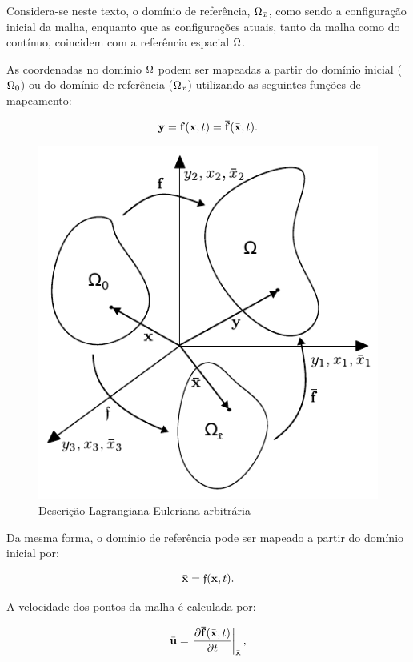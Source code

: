 \documentclass[tese_patricia]{subfiles}%
\begin{document}
Considera-se neste texto, o domínio de referência, $\Omega_{\bar{x}}$, como sendo a configuração inicial da malha, enquanto que as configurações atuais, tanto da malha como do contínuo, coincidem com a referência espacial $\Omega$.

As coordenadas no domínio $\Omega$ podem ser mapeadas a partir do domínio inicial ($\Omega_{0}$) ou do domínio de referência ($\Omega_{\bar{x}}$) utilizando as seguintes funções de mapeamento:  

\begin{align}
	\mathbf{y} = \mathbf{f}(\mathbf{x},t) = \mathbf{\bar{f}}(\bar{\mathbf{x}},t).
\end{align}

\begin{figure}[htb!]
	\centering
	\includegraphics[scale=1.0]{Imagens/Cap2/dominioALE.pdf}	
	\caption{Descrição Lagrangiana-Euleriana arbitrária}
	\label{fig:dominioAle}
\end{figure}

Da mesma forma, o domínio de referência pode ser mapeado a partir do domínio inicial por:

\begin{align}
	\bar{\mathbf{x}} = \mathfrak{f}(\mathbf{x},t).
\end{align}

A velocidade dos pontos da malha é calculada por:

\begin{align}
	\bar{\mathbf{u}} = \left. \frac{\partial \mathbf{\bar{f}}(\bar{\mathbf{x}},t)}{\partial t} \right|_{\bar{\mathbf{x}}},
\end{align}
\end{document}
